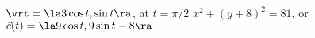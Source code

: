{$\vrt = \la 3\cos t, \sin t\ra$, at $t=\pi/2$
}
{$x^2+(y+8)^2 = 81$, or $\vec c(t) = \la 9\cos t, 9\sin t-8\ra$ 
}